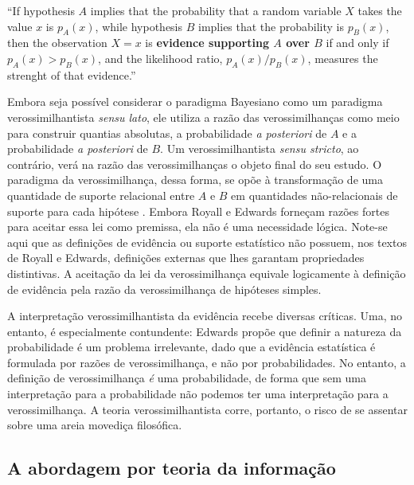 ``If hypothesis $A$ implies that the probability that a random variable $X$ takes the value $x$ is $p_A(x)$, while
hypothesis $B$ implies that the probability is $p_B(x)$, then the observation $X=x$ is \textbf{evidence supporting $A$ over $B$}
if and only if $p_A(x) > p_B(x)$, and the likelihood ratio, $p_A(x)/p_B(x)$, measures the strenght of that evidence.''
\citep{Hacking65}

Embora seja possível considerar o paradigma Bayesiano como um paradigma verossimilhantista {\em sensu lato}, 
ele utiliza a razão das verossimilhanças como meio para construir quantias absolutas, a probabilidade 
{\em a posteriori} de $A$ e a probabilidade {\em a posteriori} de $B$. Um verossimilhantista {\em sensu stricto}, ao contrário,
verá na razão das verossimilhanças
o objeto final do seu estudo. O paradigma da verossimilhança, dessa forma, se opõe à transformação de uma quantidade de 
suporte relacional entre $A$ e $B$ em quantidades não-relacionais de suporte para cada hipótese \citep{Fitelson07}.
Embora Royall e Edwards forneçam razões fortes para aceitar essa lei como premissa, ela não é uma necessidade lógica.
Note-se aqui que as definições de evidência ou suporte estatístico não possuem, nos textos de Royall e Edwards,
definições externas que lhes garantam
propriedades distintivas. A aceitação da lei da verossimilhança equivale logicamente à definição de evidência pela razão
da verossimilhança de hipóteses simples.

A interpretação verossimilhantista da evidência recebe diversas críticas. Uma, no entanto, é especialmente contundente:
Edwards propõe que definir a natureza da probabilidade é um problema irrelevante, dado que a evidência estatística é
formulada por razões de verossimilhança, e não por probabilidades. No entanto, a definição de verossimilhança {\em é} uma
probabilidade, de forma que sem uma interpretação para a probabilidade não podemos ter uma interpretação para a verossimilhança.
A teoria verossimilhantista corre, portanto, o risco de se assentar sobre uma areia movediça filosófica.

\begin{shaded}
\section{A abordagem por teoria da informação}

\end{shaded}


